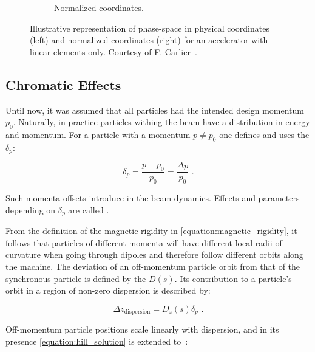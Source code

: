 \begin{figure}[!hbt]
\begin{center}
\begin{subfigure}[b]{0.45\textwidth}
\begin{center}
        \caption{Normalized coordinates.}
        \label{fig:phase_space_normalized}
        \end{center}
    \end{subfigure}
    \caption{Illustrative representation of phase-space in physical coordinates (left) and normalized coordinates (right) for an accelerator with linear elements only. Courtesy of F. Carlier~\cite{PHD:Carlier}.}
    \label{figure:phase_space_linear_physical_normalized_coordinates}
    \end{center}
\end{figure}

\subsection{Chromatic Effects}
\label{subsection:chromatic_effects}

Until now, it was assumed that all particles had the intended design momentum \(p_{0}\).
Naturally, in practice particles withing the beam have a distribution in energy and momentum.
For a particle with a momentum \(p \neq p_{0}\) one defines and uses the  \(\delta_p\):

\begin{equation}
    \delta_p = \frac{p - p_0}{p_0} = \frac{\Delta p}{p_0} \text{ .}
    \label{equation:momentum_deviation}
\end{equation}

Such momenta offsets introduce  in the beam dynamics.
Effects and parameters depending on \(\delta_p\) are called .

From the definition of the magnetic rigidity in \cref{equation:magnetic_rigidity}, it follows that particles of different momenta will have different local radii of curvature when going through dipoles and therefore follow different orbits along the machine.
The deviation of an off-momentum particle orbit from that of the synchronous particle is defined by the  \(D(s)\).
Its contribution to a particle's orbit in a region of non-zero dispersion is described by:

\begin{equation}
    \Delta z_{\mathrm{dispersion}} = D_z(s) \delta_p \text{ .}
    \label{equation:dispersion_contribution_to_orbit}
\end{equation}
\bigbreak

Off-momentum particle positions scale linearly with dispersion, and in its presence \cref{equation:hill_solution} is extended to~\cite{BOOK:Wiedemann:Particle_Accelerator_Physics}:

